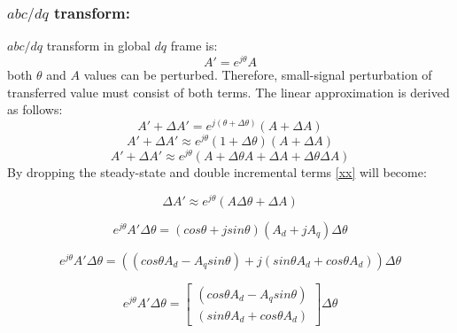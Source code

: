 \subsubsection{$abc/dq$ transform:} $abc/dq$ transform in global $dq$ frame is:
\begin{equation}\label{}
A'=e^{j\theta}A
\end{equation}
both $\theta$ and $A$ values can be perturbed. Therefore, small-signal perturbation of transferred value must consist of both terms. The linear approximation is derived as follows:
\begin{equation}\label{}
A'+\Delta A'=e^{j(\theta+\Delta \theta)}(A+\Delta A)
\end{equation}
\begin{equation}\label{}
A'+\Delta A'\approx e^{j\theta}(1+\Delta \theta)(A+\Delta A)
\end{equation}
\begin{equation}\label{xx}
A'+\Delta A'\approx e^{j\theta}(A+\Delta \theta A+\Delta A + \Delta \theta \Delta A)
\end{equation}
By dropping the steady-state and double incremental terms \ref{xx} will become:





\begin{equation}\label{}
\Delta A'\approx e^{j\theta}( A \Delta \theta+ \Delta A)
\end{equation}

\begin{equation}\label{}
e^{j\theta} A' \Delta \theta= (cos\theta+j sin\theta) (A_d+j A_q) \Delta \theta
\end{equation}

\begin{equation}\label{}
e^{j\theta} A' \Delta \theta= ((cos\theta A_d - A_q sin\theta) + j (sin\theta A_d+ cos\theta A_d)) \Delta \theta
\end{equation}

\begin{equation}\label{}
e^{j\theta} A' \Delta \theta=\begin{bmatrix} (cos\theta A_d - A_q sin\theta) \\ (sin\theta A_d+ cos\theta A_d) \end{bmatrix}\Delta \theta
\end{equation}

